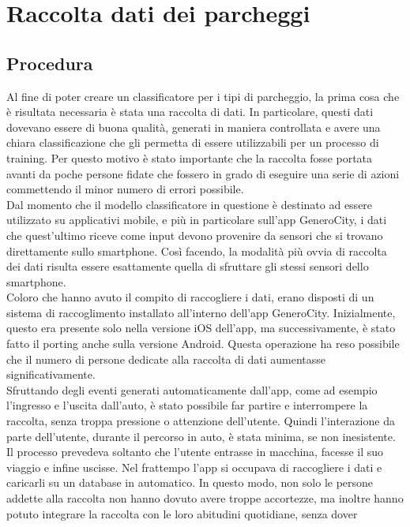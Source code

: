 \chapter{Raccolta dati dei parcheggi}
\section{Procedura} 

Al fine di poter creare un classificatore per i tipi di parcheggio, la prima cosa
che è risultata necessaria è stata una raccolta di dati. In particolare, questi dati
dovevano essere di buona qualità, generati in maniera controllata e avere una chiara
classificazione che gli permetta di essere utilizzabili per un processo di training. 
Per questo motivo è stato importante che la raccolta fosse portata
avanti da poche persone fidate che fossero in grado di eseguire una serie di azioni
commettendo il minor numero di errori possibile.\\
Dal momento che il modello classificatore in questione è destinato ad essere utilizzato
su applicativi mobile, e più in particolare sull'app GeneroCity, i dati che quest'ultimo
riceve come input devono provenire da sensori che si trovano direttamente sullo smartphone.
Così facendo, la modalità più ovvia di raccolta dei dati risulta essere esattamente 
quella di sfruttare gli stessi sensori dello smartphone.\\
Coloro che hanno avuto il compito di raccogliere i dati, erano disposti di un sistema di
raccoglimento installato all'interno dell'app GeneroCity. Inizialmente, questo era presente
solo nella versione iOS dell'app, ma successivamente, è stato fatto il porting anche sulla
versione Android. Questa operazione ha reso possibile che il numero di persone dedicate alla
raccolta di dati aumentasse significativamente.\\
Sfruttando degli eventi generati automaticamente dall'app, come ad esempio l'ingresso e
l'uscita dall'auto, è stato possibile far partire e interrompere la raccolta, senza troppa
pressione o attenzione dell'utente. Quindi l'interazione da parte dell'utente,
durante il percorso in auto, è stata minima, se non inesistente. Il processo prevedeva soltanto
che l'utente entrasse in macchina, facesse il suo viaggio e infine uscisse. Nel frattempo 
l'app si occupava di raccogliere i dati e caricarli su un database in automatico. In questo
modo, non solo le persone addette alla raccolta non hanno dovuto avere troppe accortezze, ma
inoltre hanno potuto integrare la raccolta con le loro abitudini quotidiane, senza dover
